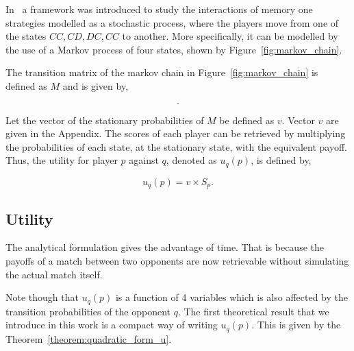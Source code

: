 \documentclass[10pt]{article}
\begin{document}
In~\cite{Nowak1990} a framework was introduced to study the interactions of memory
one strategies modelled as a stochastic process, where the players move from one
of the states \(CC, CD, DC,CC\) to another. More specifically, it can be modelled
by the use of a Markov process of four states, shown by Figure~\ref{fig:markov_chain}.

The transition matrix of the markov chain in Figure~\ref{fig:markov_chain}
is defined as \(M\) and is given by,

\begin{equation}\label{eq:m_matrix}
    .
\end{equation}

Let the vector of the stationary probabilities of \(M\) be defined as \(v\).
Vector \(v\) are given in the Appendix. %
The scores of each player can be retrieved by multiplying the probabilities of each
state, at the stationary state, with the equivalent payoff. Thus, the  utility for
player \(p\) against \(q\), denoted as \(u_q(p)\), is defined by,

\begin{equation}\label{eq:press_dyson_utility}
    u_q(p) = v \times S_p.
\end{equation}

\subsection{Utility}

The analytical formulation gives the advantage of time. That is because the 
payoffs of a match between two opponents are now retrievable without 
simulating the actual match itself.

Note though that \(u_q(p)\) is a function of 4 variables which is also affected
by the transition probabilities of the opponent \(q\). The first theoretical
result that we introduce in this work is a compact way of writing \(u_q(p)\).
This is given by the Theorem~\ref{theorem:quadratic_form_u}.
\end{document}
